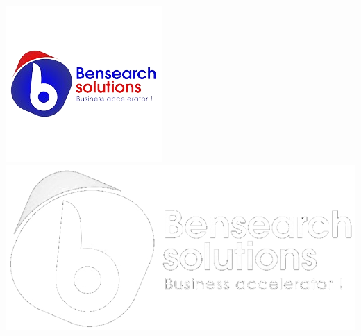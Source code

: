 \documentclass{beamer}
\begin{document}
{\begin{frame}[plain]
		\titlepage
		\includegraphics[scale=0.3]{BensearchLogo-removebg-preview.png}\hfill
			\includegraphics[scale=0.1]{bensearch.png}	
	\end{frame}
}
\end{document}
